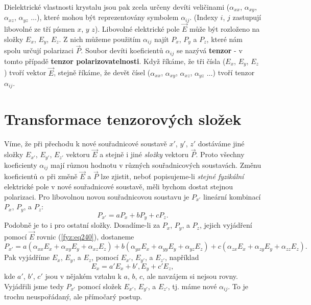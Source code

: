    Dielektrické vlastnosti krystalu jsou pak zcela určeny devíti veličinami (\(\alpha_{xx}\),
    \(\alpha_{xy}\), \(\alpha_{xz}\), \(\alpha_{yz}\) \(\ldots\)), které mohou být reprezentovány
    symbolem \(\alpha_{ij}\). (Indexy \(i\), \(j\) zastupují libovolné ze tří písmen \(x\), \(y\)
    \(z\)). Libovolné elektrické pole \(\vec{E}\) může být rozloženo na složky \(E_x\), \(E_y\),
    \(E_z\). Z nich můžeme použitím \(\alpha_{ij}\) najít \(P_x\), \(P_y\) a \(P_z\), které nám
    spolu určují polarizaci \(\vec{P}\). Soubor devíti koeficientů \(\alpha_{ij}\) se nazývá
    \textbf{tenzor} - v tomto případě \textbf{tenzor polarizovatelnosti}. Když říkáme, že tři čísla
    (\(E_x\), \(E_y\), \(E_z\)) tvoří vektor \(\vec{E}\), stejně říkáme, že devět čísel
    (\(\alpha_{xx}\), \(\alpha_{xy}\), \(\alpha_{xz}\), \(\alpha_{yz}\) \(\ldots\)) tvoří tenzor
    \(\alpha_{ij}\). 

  \section{Transformace tenzorových složek}\label{fyz:IIchapXXXIsecII}
    Víme, že při přechodu k nové souřadnicové soustavě \(x'\), \(y'\), \(z'\) dostáváme jiné složky
    \(E_{x'}\), \(E_{y'}\),  \(E_{z'}\) vektoru \(\vec{E}\) a stejně i jiné \emph{složky} vektoru
    \(\vec{P}\). Proto všechny koeficienty \(\alpha_{ij}\) mají různou hodnotu v různých
    souřadnicových soustavách. Změnu koeficientů \(\alpha\) při změně \(\vec{E}\) a \(\vec{P}\) lze
    zjistit, neboť popisujeme-li \emph{stejné fyzikální} elektrické pole v nové souřadnicové
    soustavě, měli bychom dostat stejnou polarizaci. Pro libovolnou novou souřadnicovou soustavu je
    \(P_{x'}\) lineární kombinací \(P_{x}\), \(P_{y}\), a \(P_{z}\):
    \begin{equation*}
      P_{x'} = aP_x + bP_y + cP_z.
    \end{equation*}
    Podobně je to i pro ostatní složky. Dosadíme-li za \(P_{x}\), \(P_{y}\), a \(P_{z}\), jejich
    vyjádření pomocí \(\vec{E}\) rovnic (\ref{fyz:eq240}), dostaneme
    \begin{equation*}
      P_{x'} = a(\alpha_{xx}E_x + \alpha_{xy}E_y + \alpha_{xz}E_z) +
               b(\alpha_{yx}E_x + \alpha_{yy}E_y + \alpha_{yz}E_z) + 
               c(\alpha_{zx}E_x + \alpha_{zy}E_y + \alpha_{zz}E_z).
    \end{equation*}
    Pak vyjádříme \(E_{x}\), \(E_{y}\), a \(E_{z}\), pomocí \(E_{x'}\), \(E_{y'}\), a \(E_{z'}\),
    například
    \begin{equation*}
      E_x =  a'E_x + b',E_y + c'E_z,
    \end{equation*}
    kde \(a'\), \(b'\), \(c'\) jsou v nějakém vztahu k \(a\), \(b\), \(c\), ale navzájem si nejsou
    rovny. Vyjádřili jsme tedy \(P_{x'}\) pomocí složek \(E_{x'}\), \(E_{y'}\), a \(E_{z'}\), tj.
    máme nové \(\alpha_{ij}\). To je trochu neuspořádaný, ale přímočarý postup.

